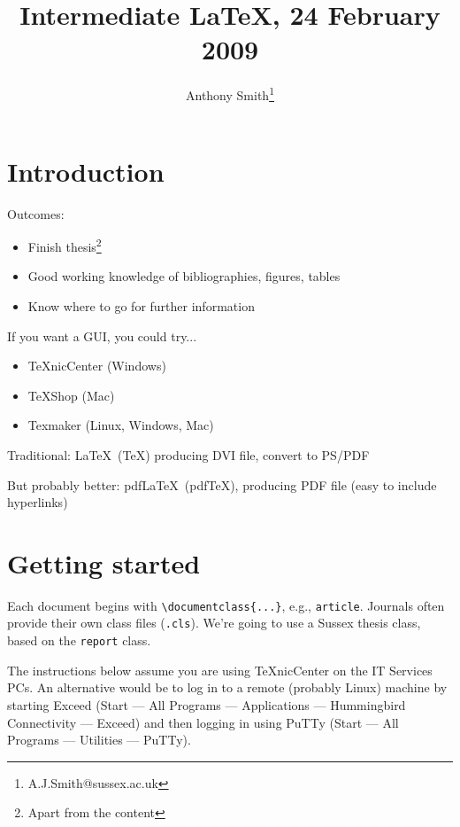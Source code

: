 \documentclass[a4paper]{article}
\title{Intermediate LaTeX, 24 February 2009}
\author{Anthony Smith\thanks{A.J.Smith@sussex.ac.uk}}
\begin{document}

\maketitle

\section{Introduction}

Outcomes:
\begin{itemize}
\item Finish thesis\footnote{Apart from the content}
\item Good working knowledge of bibliographies, figures, tables
\item Know where to go for further information
\end{itemize}

If you want a GUI, you could try...
\begin{itemize}
\item TeXnicCenter (Windows)
\item TeXShop (Mac)
\item Texmaker (Linux, Windows, Mac)
\end{itemize}

Traditional: \LaTeX\ (\TeX) producing DVI file, convert to PS/PDF

But probably better: pdf\LaTeX\ (pdf\TeX), producing PDF file (easy to include hyperlinks)

\section{Getting started}

Each document begins with \verb=\documentclass{...}=, e.g., \verb=article=. Journals often provide their own class files (\verb=.cls=). We're going to use a Sussex thesis class, based on the \verb=report= class.

The instructions below assume you are using TeXnicCenter on the IT Services PCs. An alternative would be to log in to a remote (probably Linux) machine by starting Exceed (Start --- All Programs --- Applications --- Hummingbird Connectivity --- Exceed) and then logging in using PuTTy (Start --- All Programs --- Utilities --- PuTTy). 
\end{document}
